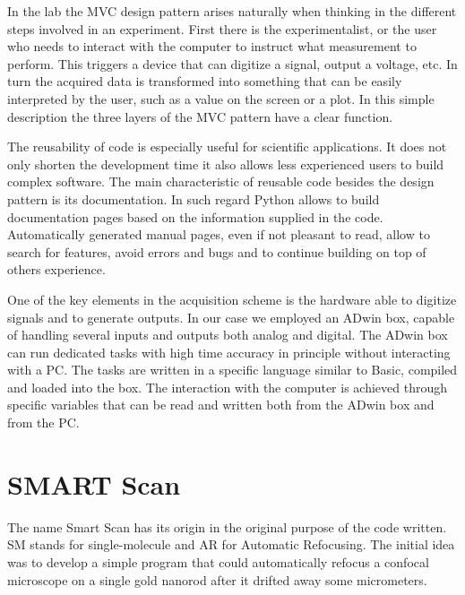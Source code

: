 In the lab the MVC design pattern arises naturally when thinking in the
different steps involved in an experiment. First there is the experimentalist,
or the user who needs to interact with the computer to instruct what measurement
to perform. This triggers a device that can digitize a signal, output a
voltage, etc. In turn the acquired data is transformed into something that can
be easily interpreted by the user, such as a value on the screen or a plot. In
this simple description the three layers of the MVC pattern have a clear
function. 

The reusability of code is especially useful for scientific applications. It
does not only shorten the development time it also allows less experienced users
to build complex software. The main characteristic of reusable code besides
the design pattern is its documentation. In such regard Python allows to build
documentation pages based on the information supplied in the code.
Automatically generated manual pages, even if not pleasant to read, allow to
search for features, avoid errors and bugs and to continue building on top of
others experience. 

One of the key elements in the acquisition scheme is the hardware able to
digitize signals and to generate outputs. In our case we employed an ADwin box,
capable of handling several inputs and outputs both analog and digital. The
ADwin box can run dedicated tasks with high time accuracy in principle without
interacting with a PC. The tasks are written in a specific language similar to
Basic, compiled and loaded into the box. The interaction with the computer is
achieved through specific variables that can be read and written both from the
ADwin box and from the PC.

\section{SMART Scan}
The name Smart Scan has its origin in the original purpose of the code written.
SM stands for single-molecule and AR for Automatic Refocusing. The initial idea
was to develop a simple program that could automatically refocus a confocal
microscope on a single gold nanorod after it drifted away some micrometers. 
